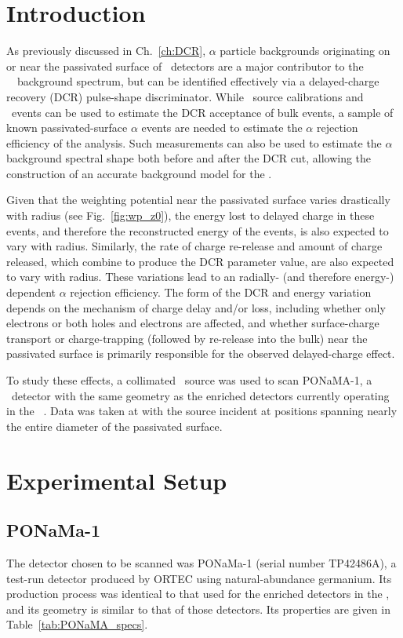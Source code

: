 \section{Introduction}
As previously discussed in Ch.~\ref{ch:DCR}, $\alpha$ particle backgrounds originating on or near the passivated surface of \ppc\ detectors are a major contributor to the \MJ\ \DEM\ background spectrum, but can be identified effectively via a delayed-charge recovery (DCR) pulse-shape discriminator. While \thtte\ source calibrations and \twonubb\ events can be used to estimate the DCR acceptance of bulk events, a sample of known passivated-surface $\alpha$ events are needed to estimate the $\alpha$ rejection efficiency of the analysis. Such measurements can also be used to estimate the $\alpha$ background spectral shape both before and after the DCR cut, allowing the construction of an accurate background model for the \DEM. 

Given that the weighting potential near the passivated surface varies drastically with radius (see Fig.~\ref{fig:wp_z0}), the energy lost to delayed charge in these events, and therefore the reconstructed energy of the events, is also expected to vary with radius. Similarly, the rate of charge re-release and amount of charge released, which combine to produce the DCR parameter value, are also expected to vary with radius. These variations lead to an radially- (and therefore energy-) dependent $\alpha$ rejection efficiency. The form of the DCR and energy variation depends on the mechanism of charge delay and/or loss, including whether only electrons or both holes and electrons are affected, and whether surface-charge transport or charge-trapping (followed by re-release into the bulk) near the passivated surface is primarily responsible for the observed delayed-charge effect. 

To study these effects, a collimated \am\ source was used to scan PONaMA-1, a \ppc\ detector with the same geometry as the enriched detectors currently operating in the \MJ\ \DEM. Data was taken at with the source incident at positions spanning nearly the entire diameter of the passivated surface. 

\section{Experimental Setup}
\subsection{PONaMa-1}
The detector chosen to be scanned was PONaMa-1 (serial number TP42486A), a test-run detector produced by ORTEC using natural-abundance germanium. Its production process was identical to that used for the enriched detectors in the \DEM, and its geometry is similar to that of those detectors. Its properties are given in Table~\ref{tab:PONaMA_specs}. 

